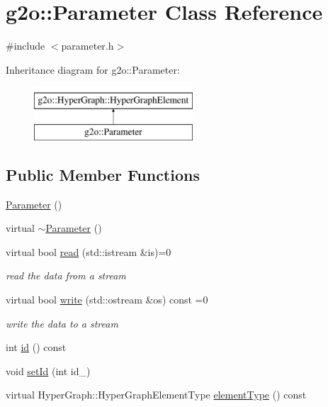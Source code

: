 \hypertarget{classg2o_1_1_parameter}{}\section{g2o\+:\+:Parameter Class Reference}
\label{classg2o_1_1_parameter}


{\ttfamily \#include $<$parameter.\+h$>$}

Inheritance diagram for g2o\+:\+:Parameter\+:\begin{figure}[H]
\begin{center}
\leavevmode
\includegraphics[height=2.000000cm]{classg2o_1_1_parameter}
\end{center}
\end{figure}
\subsection*{Public Member Functions}
\begin{DoxyCompactItemize}
\item 
\mbox{\hyperlink{classg2o_1_1_parameter_a34ef4c50461a0ab0ae9bd26944fac4de}{Parameter}} ()
\item 
virtual \mbox{\hyperlink{classg2o_1_1_parameter_a03a4d78df10d25ddf14a52872f872913}{$\sim$\+Parameter}} ()
\item 
virtual bool \mbox{\hyperlink{classg2o_1_1_parameter_a77d9d88d8bde52198631fcd0fc4c9d0e}{read}} (std\+::istream \&is)=0
\begin{DoxyCompactList}\small\item\em read the data from a stream \end{DoxyCompactList}\item 
virtual bool \mbox{\hyperlink{classg2o_1_1_parameter_a18e66a40cd71a4da2ab9be5ba318abb7}{write}} (std\+::ostream \&os) const =0
\begin{DoxyCompactList}\small\item\em write the data to a stream \end{DoxyCompactList}\item 
int \mbox{\hyperlink{classg2o_1_1_parameter_a1bca491a08b68a7a6b85204a5a8b0f2c}{id}} () const
\item 
void \mbox{\hyperlink{classg2o_1_1_parameter_a2872398ab7d8c95d0a1b5ca5bbfae461}{set\+Id}} (int id\+\_\+)
\item 
virtual Hyper\+Graph\+::\+Hyper\+Graph\+Element\+Type \mbox{\hyperlink{classg2o_1_1_parameter_a44ace751794dcde7a5fd52d16e2f4f21}{element\+Type}} () const
\end{DoxyCompactItemize}
